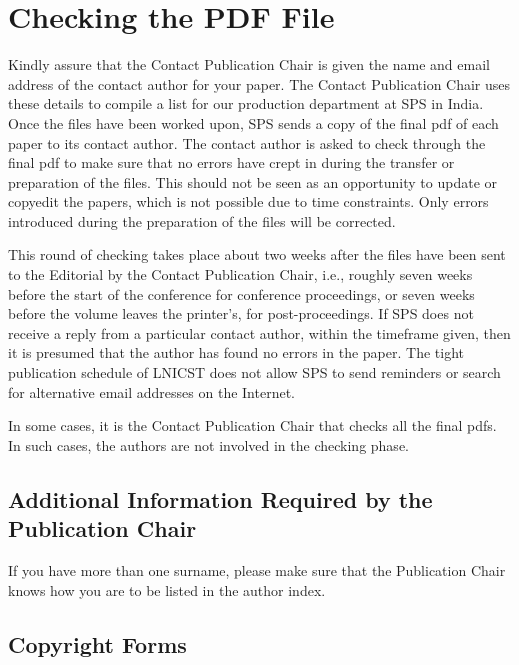 \documentclass[lnicst,sechang,a4paper]{svmultln}
\begin{document}
\section{Checking the PDF File}

Kindly assure that the Contact Publication Chair is given the name and email
address of the contact author for your paper. The Contact Publication Chair
uses these details to compile a list for our production department at
SPS in India. Once the files have been worked upon, SPS sends a copy of
the final pdf of each paper to its contact author. The contact author is
asked to check through the final pdf to make sure that no errors have
crept in during the transfer or preparation of the files. This should
not be seen as an opportunity to update or copyedit the papers, which is
not possible due to time constraints. Only errors introduced during the
preparation of the files will be corrected.

This round of checking takes place about two weeks after the files have
been sent to the Editorial by the Contact Publication Chair, i.e., roughly
seven weeks before the start of the conference for conference
proceedings, or seven weeks before the volume leaves the printer's, for
post-proceedings. If SPS does not receive a reply from a particular
contact author, within the timeframe given, then it is presumed that the
author has found no errors in the paper. The tight publication schedule
of LNICST does not allow SPS to send reminders or search for alternative
email addresses on the Internet.

In some cases, it is the Contact Publication Chair that checks all the final
pdfs. In such cases, the authors are not involved in the checking phase.

\subsection{Additional Information Required by the Publication Chair}

If you have more than one surname, please make sure that the Publication Chair
knows how you are to be listed in the author index.

\subsection{Copyright Forms}
\end{document}
